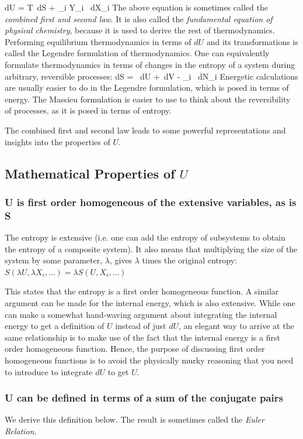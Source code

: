 \documentclass[12pt]{article}
\begin{document}
\eqs
dU = T\, dS + \sum_i Y_i \, dX_i
\eqe
The above equation is sometimes called the \emph{combined first and second law}. It is also called the \emph{fundamental equation of physical chemistry}, because it is used to derive the rest of thermodynamics. Performing equilibrium thermodynamics in terms of $dU$ and its transformations is called the Legendre formulation of thermodynamics. One can equivalently formulate thermodynamics in terms of changes in the entropy of a system during arbitrary, reversible processes:
\eqs
dS = \, dU +\, dV - \sum_i \, dN_i
\eqe
Energetic calculations are usually easier to do in the Legendre formulation, which is posed in terms of energy. The Massieu formulation is easier to use to think about the reversibility of processes, as it is posed in terms of entropy.

The combined first and second law leads to some powerful representations and insights into the properties of $U$.

\subsection{Mathematical Properties of $U$}
\subsubsection{U is first order homogeneous of the extensive variables, as is S}
The entropy is extensive (i.e. one can add the entropy of subsystems to obtain the entropy of a composite system). It also means that multiplying the size of the system by some parameter, $\lambda$, gives $\lambda$ times the original entropy: 
$S(\lambda U, \lambda X_i,...)=\lambda S(U,X_i,...)$

This states that the entropy is a first order homogeneous function. A similar argument can be made for the internal energy, which is also extensive. While one can make a somewhat hand-waving argument about integrating the internal energy to get a definition of $U$ instead of just $dU$, an elegant way to arrive at the same relationship is to make use of the fact that the internal energy is a first order homogeneous function. Hence, the purpose of discussing first order homogeneous functions is to avoid the physically murky reasoning that you need to introduce to integrate $dU$ to get $U$.

\subsubsection{U can be defined in terms of a sum of the conjugate pairs}
We derive this definition below. The result is sometimes called the \emph{Euler Relation}.
\end{document}
